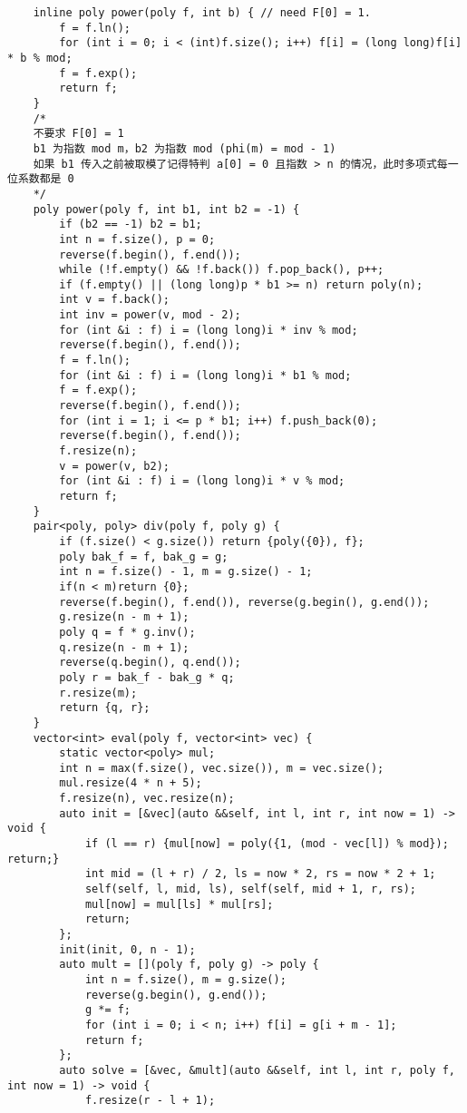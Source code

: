 \begin{verbatim}
    inline poly power(poly f, int b) { // need F[0] = 1.
        f = f.ln();
        for (int i = 0; i < (int)f.size(); i++) f[i] = (long long)f[i] * b % mod;
        f = f.exp();
        return f;
    }
    /*
    不要求 F[0] = 1
    b1 为指数 mod m，b2 为指数 mod (phi(m) = mod - 1)
    如果 b1 传入之前被取模了记得特判 a[0] = 0 且指数 > n 的情况，此时多项式每一位系数都是 0
    */
    poly power(poly f, int b1, int b2 = -1) {
        if (b2 == -1) b2 = b1;
        int n = f.size(), p = 0;
        reverse(f.begin(), f.end());
        while (!f.empty() && !f.back()) f.pop_back(), p++;
        if (f.empty() || (long long)p * b1 >= n) return poly(n);
        int v = f.back();
        int inv = power(v, mod - 2);
        for (int &i : f) i = (long long)i * inv % mod;
        reverse(f.begin(), f.end());
        f = f.ln();
        for (int &i : f) i = (long long)i * b1 % mod;
        f = f.exp();
        reverse(f.begin(), f.end());
        for (int i = 1; i <= p * b1; i++) f.push_back(0);
        reverse(f.begin(), f.end());
        f.resize(n);
        v = power(v, b2);
        for (int &i : f) i = (long long)i * v % mod;
        return f;
    }
    pair<poly, poly> div(poly f, poly g) {
        if (f.size() < g.size()) return {poly({0}), f};
        poly bak_f = f, bak_g = g;
        int n = f.size() - 1, m = g.size() - 1;
        if(n < m)return {0};
        reverse(f.begin(), f.end()), reverse(g.begin(), g.end());
        g.resize(n - m + 1);
        poly q = f * g.inv();
        q.resize(n - m + 1);
        reverse(q.begin(), q.end());
        poly r = bak_f - bak_g * q;
        r.resize(m);
        return {q, r};
    }
    vector<int> eval(poly f, vector<int> vec) {
        static vector<poly> mul;
        int n = max(f.size(), vec.size()), m = vec.size();
        mul.resize(4 * n + 5);
        f.resize(n), vec.resize(n);
        auto init = [&vec](auto &&self, int l, int r, int now = 1) -> void {
            if (l == r) {mul[now] = poly({1, (mod - vec[l]) % mod}); return;}
            int mid = (l + r) / 2, ls = now * 2, rs = now * 2 + 1;
            self(self, l, mid, ls), self(self, mid + 1, r, rs);
            mul[now] = mul[ls] * mul[rs];
            return;
        };
        init(init, 0, n - 1);
        auto mult = [](poly f, poly g) -> poly {
            int n = f.size(), m = g.size();
            reverse(g.begin(), g.end());
            g *= f;
            for (int i = 0; i < n; i++) f[i] = g[i + m - 1];
            return f;
        };
        auto solve = [&vec, &mult](auto &&self, int l, int r, poly f, int now = 1) -> void {
            f.resize(r - l + 1);

\end{verbatim}
